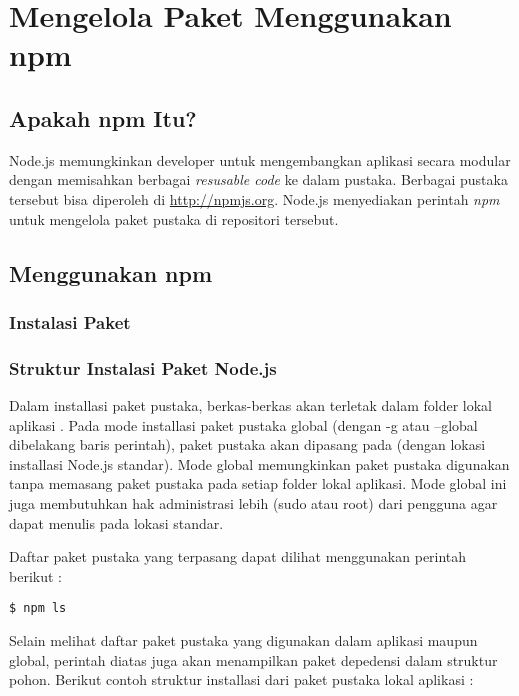 \chapter{Mengelola Paket Menggunakan npm}

\section{Apakah npm Itu?}

Node.js memungkinkan developer untuk mengembangkan aplikasi secara modular dengan memisahkan berbagai \textit{resusable code} ke dalam pustaka. Berbagai pustaka tersebut bisa diperoleh di \url{http://npmjs.org}. Node.js menyediakan perintah \textit{npm} untuk mengelola paket pustaka di repositori tersebut.

\section{Menggunakan npm}

\subsection{Instalasi Paket}

\subsection{Struktur Instalasi Paket Node.js}

Dalam installasi paket pustaka, berkas-berkas akan terletak dalam folder lokal aplikasi . Pada mode installasi paket pustaka global (dengan -g atau --global dibelakang baris perintah), paket pustaka akan dipasang pada  (dengan lokasi installasi Node.js standar). Mode global memungkinkan paket pustaka digunakan tanpa memasang paket pustaka pada setiap folder lokal aplikasi. Mode global ini juga membutuhkan hak administrasi lebih (sudo atau root) dari pengguna agar dapat menulis pada lokasi standar.

Daftar paket pustaka yang terpasang dapat dilihat menggunakan perintah berikut :

\lstset{language=bash,caption=Hasil instalasi Flatiron}
\begin{lstlisting}
$ npm ls
\end{lstlisting}

Selain melihat daftar paket pustaka yang digunakan dalam aplikasi maupun global, perintah diatas juga akan menampilkan paket depedensi dalam struktur pohon. Berikut contoh struktur installasi dari paket pustaka lokal aplikasi :

